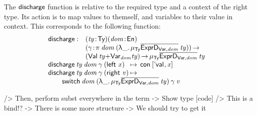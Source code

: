 The $\discharge$ function is relative to the required type and a
context of the right type. Its action is to map values to themself,
and variables to their value in context. This corresponds to the
following function:
%
\[\stk{
\begin{array}{@{}ll}
\discharge : & \PITEL{\V{ty}}{\Ty}
               \PITEL{\V{dom}}{\EnumU} \\
             & \PI{\V{\gamma}}{\spi{\V{dom}}{(\LAM{\_} \IMu{\Ty}{\toIDesc{\HExprVarD{\V{dom}}}}{\V{ty}})}} \\
             & (\SUM{\Val{\V{ty}}}{\Var{\V{dom}}{\V{ty}}}) \To
               \IMu{\Ty}{\toIDesc{\HExprVarD{\V{dom}}}}{\V{ty}} 
\end{array} \\
\begin{array}{@{}l@{\:\mapsto\:\:}l}
\discharge\: \V{ty}\: \V{dom}\: \V{\gamma}\: (\SumLeft \V{x})  & \Con{\pair{\Eval{\!}}{\V{x}}{}} \\
\discharge\: \V{ty}\: \V{dom}\: \V{\gamma}\: (\SumRight \V{v}) &
\end{array}\\
\qquad\switch{\V{dom}}{(\LAM{\_}
\IMu{\Ty}{\toIDesc{\HExprVarD{\V{dom}}}}{\V{ty}})}{\V{\gamma}}{\V{v}}
}\]

\begin{wstructure}
            /> Then, perform subst everywhere in the term
                -> Show type [code]
                /> This is a bind!?
                -> There is some more structure 
                    -> We should try to get it
\end{wstructure}

\newcommand{\substH}{\F{substExpr}}
\newcommand{\domNat}{dom_{\CN{nat}}}
\newcommand{\domBool}{dom_{\CN{bool}}}
\newcommand{\gammaNat}{\V{\ensuremath{\gamma_{\CN{nat}}}}}
\newcommand{\gammaBool}{\V{\ensuremath{\gamma_{\CN{bool}}}}}
\newcommand{\GammaSpi}[2]{\F{\ensuremath{\Gamma_{\CN{ty}}}}\: #1\: #2}


